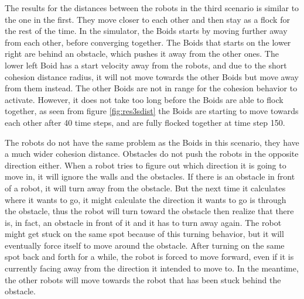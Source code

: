 The results for the distances between the robots in the third scenario is similar to the one in the first. They move closer to each other and then stay as a flock for the rest of the time. In the simulator, the Boids starts by moving further away from each other, before converging together.
The Boids that starts on the lower right are behind an obstacle, which pushes it away from the other ones. The lower left Boid has a start velocity away from the robots, and due to the short cohesion distance radius, it will not move towards the other Boids but move away from them instead. The other Boids are not in range for the cohesion behavior to activate.
However, it does not take too long before the Boids are able to flock together, as seen from figure \ref{fig:res3sdist} the Boids are starting to move towards each other after 40 time steps, and are fully flocked together at time step 150. 

The robots do not have the same problem as the Boids in this scenario, they have a much wider cohesion distance. Obstacles do not push the robots in the opposite direction either. When a robot tries to figure out which direction it is going to move in, it will ignore the walls and the obstacles. If there is an obstacle in front of a robot, it will turn away from the obstacle. But the next time it calculates where it wants to go, it might calculate the direction it wants to go is through the obstacle, thus the robot will turn toward the obstacle then realize that there is, in fact, an obstacle in front of it and it has to turn away again. The robot might get stuck on the same spot because of this turning behavior, but it will eventually force itself to move around the obstacle. After turning on the same spot back and forth for a while, the robot is forced to move forward, even if it is currently facing away from the direction it intended to move to. In the meantime, the other robots will move towards the robot that has been stuck behind the obstacle.

